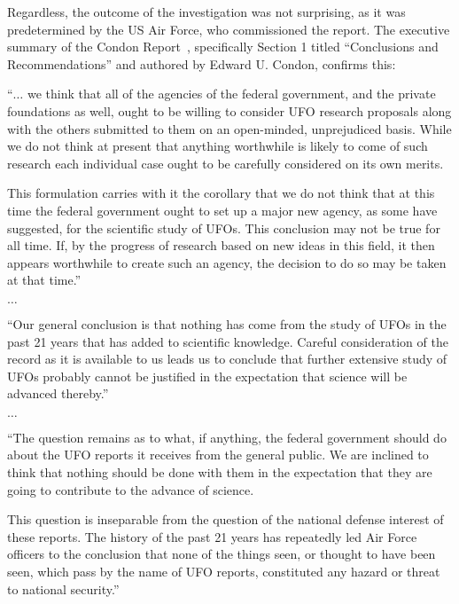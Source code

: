 Regardless, the outcome of the investigation was not surprising, as it was predetermined by the US Air Force, who commissioned the report. The executive summary of the Condon Report~\cite{Condon-report1,Condon-report2,Condon-report3,Condon-report,Condon-report-Bantam,Condon-report-Dutton}, specifically Section 1 titled ``Conclusions and Recommendations'' and authored by Edward U. Condon, confirms this:
\begin{svgraybox}
``$\ldots$ we think that all of the agencies of the federal government, and the private foundations as well,
ought to be willing to consider UFO research proposals along with the others submitted to them on an open-minded, unprejudiced basis.
 While we do not think at present that anything worthwhile is likely to come of such research each individual case ought
to be carefully considered on its own merits.

This formulation carries with it the corollary that we do not think that at this time the federal government ought
to set up a major new agency, as some have suggested, for the scientific study of UFOs.
This conclusion may not be true for all time. If, by the progress of research based on new ideas in this field,
it then appears worthwhile to create such an agency, the decision to do so may be taken at that time.''

$\ldots$

``Our general conclusion is that nothing has come from the study of UFOs in the past 21 years that has added to scientific knowledge.
Careful consideration of the record as it is available to us leads us to conclude that further extensive study of
UFOs probably cannot be justified in the expectation that science will be advanced thereby.''

$\ldots$

``The question remains as to what, if anything, the federal government should do about the UFO reports it receives from the general public.
We are inclined to think that nothing should be done with them in the expectation that they are going to contribute to the advance of science.

This question is inseparable from the question of the national defense interest of these reports.
The history of the past 21 years has repeatedly led Air Force officers to the conclusion that none of the things seen,
or thought to have been seen, which pass by the name of UFO reports, constituted any hazard or threat to national security.''




\end{svgraybox}
